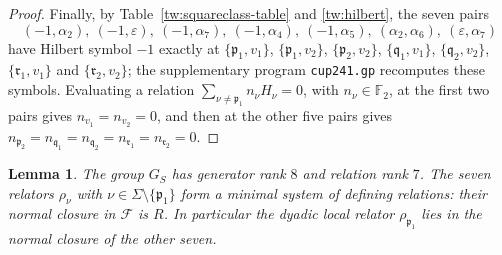 \documentclass[11pt]{amsart}
\numberwithin{equation}{section}
\newtheorem{lemma}[equation]{Lemma}
\theoremstyle{definition}
\theoremstyle{remark}
\newcommand{\Ftwo}{\mathbb F_2}
\begin{document}
\begin{proof}
Finally, by Table~\ref{tw:squareclass-table} and \eqref{tw:hilbert}, the
seven pairs
\[
 (-1,\alpha_2),\ (-1,\varepsilon),\ (-1,\alpha_7),\ (-1,\alpha_4),\
 (-1,\alpha_5),\ (\alpha_2,\alpha_6),\ (\varepsilon,\alpha_7)
\]
have Hilbert symbol $-1$ exactly at $\{\mathfrak p_1,v_1\}$,
$\{\mathfrak p_1,v_2\}$, $\{\mathfrak p_2,v_2\}$, $\{\mathfrak q_1,v_1\}$,
$\{\mathfrak q_2,v_2\}$, $\{\mathfrak r_1,v_1\}$ and $\{\mathfrak r_2,v_2\}$;
the supplementary program \texttt{cup241.gp} recomputes these symbols.
Evaluating a relation $\sum_{\nu\ne\mathfrak p_1}n_\nu H_\nu=0$, with
$n_\nu\in\Ftwo$, at the first two pairs gives $n_{v_1}=n_{v_2}=0$, and then
at the other five pairs gives
$n_{\mathfrak p_2}=n_{\mathfrak q_1}=n_{\mathfrak q_2}=n_{\mathfrak r_1}=n_{\mathfrak r_2}=0$.
\end{proof}

\begin{lemma}\label{tw:complete-global-presentation}
The group $G_S$ has generator rank $8$ and relation rank $7$. The
seven relators $\rho_\nu$ with $\nu\in\Sigma\setminus\{\mathfrak p_1\}$ form
a minimal system of defining relations: their normal closure in
$\mathcal F$ is $R$. In particular the dyadic local relator
$\rho_{\mathfrak p_1}$ lies in the normal closure of the other seven.
\end{lemma}
\end{document}

